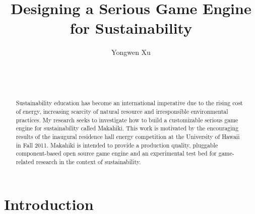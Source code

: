 \documentclass{acm_proc_article-sp}
\begin{document}
\title{Designing a Serious Game Engine for Sustainability}


\author{
\smallskip
Yongwen Xu\\ 
       \\
       \\
       \\
}

\maketitle
\begin{abstract}
Sustainability education has become an international imperative due to the rising cost of energy, increasing scarcity of natural resource and irresponsible environmental practices. My research seeks to investigate how to build a customizable serious game engine for sustainability called Makahiki. This work is motivated by the encouraging results of the inaugural residence hall energy competition at the University of Hawaii in Fall 2011. Makahiki is intended to provide a production quality, pluggable component-based open source game engine and an experimental test bed for game-related research in the context of sustainability.
  
\end{abstract}




\section{Introduction}
\end{document}
